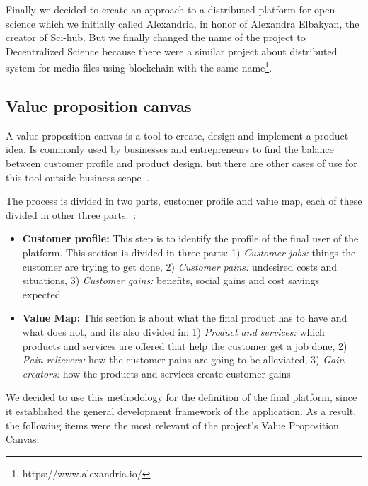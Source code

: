 Finally we decided to create an approach to a distributed platform for open
science which we initially called Alexandria, in honor of Alexandra Elbakyan,
the creator of Sci-hub. But we finally changed the name of the project to
Decentralized Science because there were a similar project about distributed
system for media files using blockchain with the same
name\footnote{https://www.alexandria.io/}.

\subsection{Value proposition canvas}


A value proposition canvas is a tool to create, design and implement a product
idea. Is commonly used by businesses and entrepreneurs to find the balance
between customer profile and product design, but there are other cases of use
for this tool outside business
scope~\cite{pokorna2015value,meertens2012mapping}.

The process is divided in two parts, customer profile and value map, each of
these divided in other three parts:~\cite{osterwalder2014value}:

\begin{itemize}
\item \textbf{Customer profile:} This step is to identify the profile of the
  final user of the platform. This section is divided in three parts: 1)
  \emph{Customer jobs:} things the customer are trying to get done, 2)
  \emph{Customer pains:} undesired costs and situations, 3) \emph{Customer
    gains:} benefits, social gains and cost savings expected.
\item \textbf{Value Map:} This section is about what the final product has to
  have and what does not, and its also divided in: 1) \emph{Product and
    services:} which products and services are offered that help the customer
  get a job done, 2) \emph{Pain relievers:} how the customer pains are going to
  be alleviated, 3) \emph{Gain creators:} how the products and services create
  customer gains
\end{itemize}

We decided to use this methodology for the definition of the final platform,
since it established the general development framework of the application. As a
result, the following items were the most relevant of the project's Value
Proposition Canvas:

